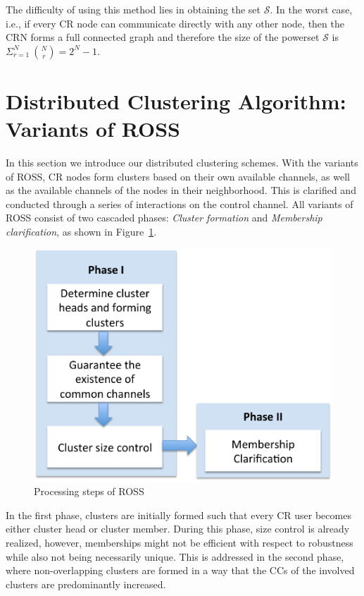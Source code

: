 \documentclass[times]{ettauth}
\newcommand{\ie}{i.e., }
\theoremstyle{mytheoremstyle}
\theoremstyle{mytheoremstyle}
\theoremstyle{mytheoremstyle}
\begin{document}
The difficulty of using this method lies in obtaining the set $\mathcal{S}$.
In the worst case, \ie if every CR node can communicate directly with any other node, then the CRN forms a full connected graph and therefore the size of the powerset $\mathcal{S}$ is $\Sigma_{r=1}^{N}\ {N \choose r} = 2^N-1$.

\section{Distributed Clustering Algorithm: Variants of ROSS}
\label{ross}

In this section we introduce our distributed clustering schemes.
With the variants of ROSS, CR nodes form clusters based on their own available channels, as well as the available channels of the nodes in their neighborhood.
This is clarified and conducted through a series of interactions on the control channel.
All variants of ROSS consist of two cascaded phases: \textit{Cluster formation} and \textit{Membership clarification}, as shown in Figure~\ref{flowChartROSS}.
\begin{figure}[ht!]
  \centering
\includegraphics[width=0.9\linewidth]{flow_chart.pdf}
	\caption{Processing steps of ROSS}
	\label{flowChartROSS}
\end{figure}
In the first phase, clusters are initially formed such that every CR user becomes either cluster head or cluster member.
During this phase, size control is already realized, however, memberships might not be efficient with respect to robustness while also not being necessarily unique.
This is addressed in the second phase, where non-overlapping clusters are formed in a way that the CCs of the involved clusters are predominantly increased.
\end{document}
